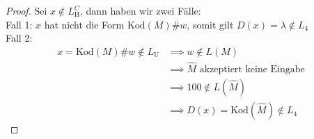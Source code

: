\documentclass[a4paper,ngerman,12pt]{exam}
\newcommand\kod{\text{Kod}}
\newcommand\Lu{L_{\mathrm{U}}}
\newcommand\Lh{L_{\mathrm{H}}}
\begin{document}
\begin{questions}
\begin{solutionorbox}[22em]
\begin{proof}
        Sei $x \not\in \Lh^C$, dann haben wir zwei Fälle: \\
        Fall 1: $x$ hat nicht die Form $\kod(M)\#w$, somit gilt $D(x)=\lambda \not\in L_4$ \\
        Fall 2:
        \begin{align*}
          x = \kod(M)\#w \not\in \Lu &\implies w \not\in L(M) \\
          &\implies \widehat{M} \text{ akzeptiert keine Eingabe} \\
          &\implies 100 \not \in L(\widehat{M}) \\
          &\implies D(x) = \kod(\widehat{M}) \not\in L_4
        \end{align*}
      \end{proof}
    \end{solutionorbox}
\end{questions}
\end{document}
